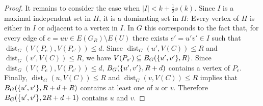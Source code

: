 \documentclass{patmorin}
\newcommand{\pat}[1]{\textcolor{Blue}{Pat: #1}}
\DeclareMathOperator{\dist}{dist}
\DeclarePairedDelimiter\set{\{}{\}}
\begin{document}
\begin{proof}
  It remains to consider the case when $|I| < k+\frac{1}{2}s(k)$.
  Since $I$ is a maximal independent set in $H$, it is a dominating set in $H$: Every vertex of $H$ is either in $I$ or adjacent to a vertex in $I$.  In $G$ this corresponds to the fact that, for every edge of $e=uv\in E(G_R)\setminus E(U)$ there exists $e'=u'v'\in I$ such that $\dist_G(V(P_{e}),V(P_{e'}))\le d$.
  Since $\dist_G(u',V(C))\leq R$ and $\dist_G(v',V(C))\leq R$,
  we have $V(P_{e'}) \subseteq B_G(\set{u',v'},R)$. Since $\dist_G(V(P_e),V(P_{e'}))\le d$,  $B_G(\set{u',v'},R+d)$ contains a vertex of $P_e$.
  Finally, $\dist_G(u,V(C))\leq R$ and $\dist_G(v,V(C))\leq R$ implies that
  $B_{G}(\set{u',v'},R+d+R)$ contains at least one of $u$ or $v$.  Therefore $B_{G}(\set{u',v'},2R+d+1)$ contains $u$ and $v$.
\end{proof}
  
\end{document}

